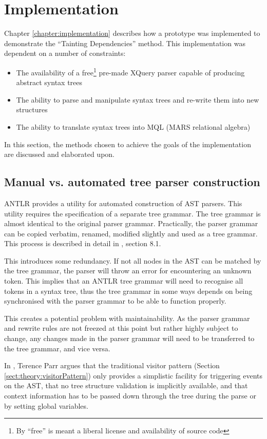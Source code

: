\section{Implementation}
\label{sect:disc:contextSens}
Chapter \ref{chapter:implementation} describes how a prototype was implemented
to demonstrate the ``Tainting Dependencies'' method. This implementation
was dependent on a number of constraints:
\begin{itemize}
  \item The availability of a free\footnote{By ``free'' is meant a liberal
  license and availability of source code} pre-made XQuery parser capable of
  producing abstract syntax trees
  \item The ability to parse and manipulate syntax trees and re-write them into
  new structures
  \item The ability to translate syntax trees into MQL (MARS relational algebra)
\end{itemize}

In this section, the methods chosen to achieve the goals of the implementation
are discussed and elaborated upon.

\subsection{Manual vs. automated tree parser construction}
ANTLR provides a utility for automated construction of AST parsers. This
utility requires the specification of a separate tree grammar. The tree
grammar is almost identical to the original parser grammar. Practically, the
parser grammar can be copied verbatim, renamed, modified slightly and used as
a tree  grammar. This process is described in detail in \cite{definitiveAntlr},
section 8.1.

This introduces some redundancy. If not all nodes in the AST can be matched by
the tree grammar, the parser will throw an error for encountering an unknown
token. This implies that an ANTLR tree grammar will need to recognise all tokens
in a syntax tree, thus the tree grammar in some ways depends on being
synchronised with the parser grammar to be able to function properly.

This creates a potential problem with maintainability. As the parser grammar and
rewrite rules are not freezed at this point but rather highly subject to
change, any changes made in the parser grammar will need to be transferred to
the tree grammar, and vice versa.

In \cite{translators_should_use_tree_grammars}, Terence Parr argues that the
traditional visitor pattern (Section \ref{sect:theory:visitorPattern}) only
provides a simplistic facility for triggering events on the AST, that no tree
structure validation is implicitly available, and that context information has to be
passed down through the tree during the parse or by setting global variables.

